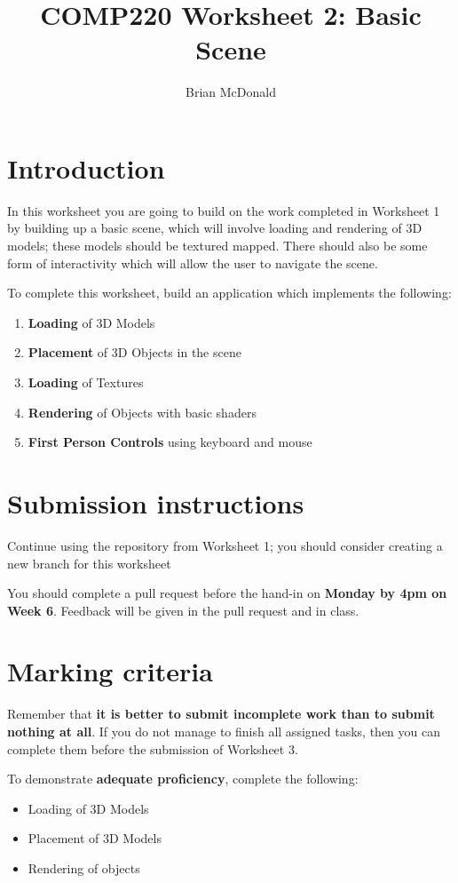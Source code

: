 \documentclass{../../../fal_assignment}
\title{COMP220 Worksheet 2: Basic Scene}
\author{Brian McDonald}
\begin{document}
\maketitle

\section*{Introduction}

In this worksheet you are going to build on the work completed in Worksheet 1 by building up a basic scene, which will involve loading and rendering of 3D models; these models should be textured mapped. There should also be some form of interactivity which will allow the user to navigate the scene.

To complete this worksheet, build an application which implements the following:
\begin{enumerate}[label=(\alph*)]
	\item \textbf{Loading} of 3D Models
	\item \textbf{Placement} of 3D Objects in the scene
	\item \textbf{Loading} of Textures
	\item \textbf{Rendering} of Objects with basic shaders
	\item \textbf{First Person Controls} using keyboard and mouse
\end{enumerate}

\section*{Submission instructions}

Continue using the repository from Worksheet 1; you should consider creating a new branch for this worksheet

You should complete a pull request before the hand-in on \textbf{Monday by 4pm on Week 6}. Feedback will be given in the pull request and in class.

\section*{Marking criteria}

Remember that \textbf{it is better to submit incomplete work than to submit nothing at all}. If you do not manage to finish all assigned tasks, then you can complete them before the submission of Worksheet 3.

To demonstrate \textbf{adequate proficiency}, complete the following:
\begin{itemize}
	\item Loading of 3D Models
	\item Placement of 3D Models
	\item Rendering of objects
\end{itemize} 
\end{document}

